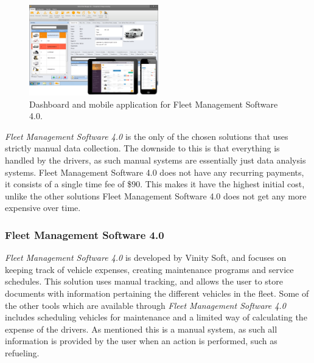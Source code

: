 \begin{figure}[h!]
    \centering
    \includegraphics[width=0.5\textwidth]{img/FleetManagementSoftware.png}
    \caption{Dashboard and mobile application for Fleet Management Software 4.0.}
    \label{fig:Fleet_Management_Software}
\end{figure}
\textit{Fleet Management Software 4.0} is the only of the chosen solutions that uses strictly manual data collection.
The downside to this is that everything is handled by the drivers, as such manual systems are essentially just data analysis systems.
Fleet Management Software 4.0 does not have any recurring payments, it consists of a single time fee of \$90.
This makes it have the highest initial cost, unlike the other solutions Fleet Management Software 4.0 does not get any more expensive over time.

\subsubsection{Fleet Management Software 4.0}
\textit{Fleet Management Software 4.0} is developed by Vinity Soft, and focuses on keeping track of vehicle expenses, creating maintenance programs and service schedules\cite{vinitysoft}.
This solution uses manual tracking, and allows the user to store documents with information pertaining the different vehicles in the fleet.
Some of the other tools which are available through \textit{Fleet Management Software 4.0} includes scheduling vehicles for maintenance and a limited way of calculating the expense of the drivers.
As mentioned this is a manual system, as such all information is provided by the user when an action is performed, such as refueling.
